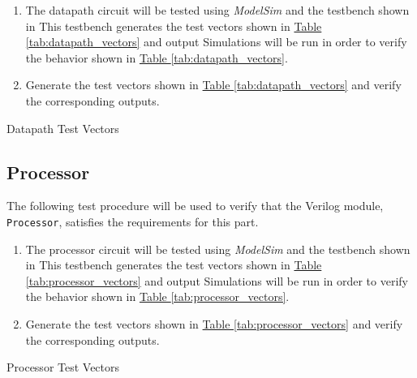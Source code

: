 \begin{enumerate}
    \item The datapath circuit will be tested using \emph{ModelSim} and the testbench shown in %
    This testbench generates the test vectors shown in \hyperref[tab:datapath_vectors]{Table \ref*{tab:datapath_vectors}} and output %
    Simulations will be run in order to verify the behavior shown in \hyperref[tab:datapath_vectors]{Table \ref*{tab:datapath_vectors}}.
    \item Generate the test vectors shown in \hyperref[tab:datapath_vectors]{Table \ref*{tab:datapath_vectors}}
    and verify the corresponding outputs.
\end{enumerate}

\begin{table}[htbp]
    \centering
    \caption{Datapath Test Vectors\label{tab:datapath_vectors}}
\end{table}


\subsection{Processor} %
\label{sub:processor}

The following test procedure will be used to verify that the Verilog module, \verb|Processor|, satisfies the requirements for this part.

\begin{enumerate}
    \item The processor circuit will be tested using \emph{ModelSim} and the testbench shown in %
    This testbench generates the test vectors shown in \hyperref[tab:processor_vectors]{Table \ref*{tab:processor_vectors}} and output %
    Simulations will be run in order to verify the behavior shown in \hyperref[tab:processor_vectors]{Table \ref*{tab:processor_vectors}}.
    \item Generate the test vectors shown in \hyperref[tab:processor_vectors]{Table \ref*{tab:processor_vectors}}
    and verify the corresponding outputs.
\end{enumerate}

\begin{table}[htbp]
    \centering
    \caption{Processor Test Vectors\label{tab:processor_vectors}}
\end{table}

